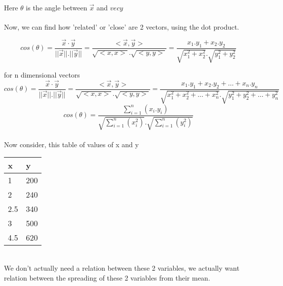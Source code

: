 \documentclass{article}
\begin{document}
\\
Here $\theta$ is the angle between $\vec{x}$ and $vec{y}$\\\\
Now, we can find how 'related' or 'close' are 2 vectors, using the dot product.

$$
  cos(\theta)=\frac{\vec{x}\cdot\vec{y}}{||\vec{x}||.||\vec{y}||}=\frac{<\vec{x},\vec{y}>}{\sqrt{<x,x>}.\sqrt{<y,y>}}=\frac{x_1.y_1+x_2.y_2}{\sqrt{x_1^2+x_2^2}.\sqrt{y_1^2+y_2^2}}
$$

for n dimensional vectors
$$
  cos(\theta)=\frac{\vec{x}\cdot\vec{y}}{||\vec{x}||.||\vec{y}||}=\frac{<\vec{x},\vec{y}>}{\sqrt{<x,x>}.\sqrt{<y,y>}}=\frac{x_1.y_1+x_2.y_2+\dots+x_n.y_n}{\sqrt{x_1^2+x_2^2+\dots+x_n^2}.\sqrt{y_1^2+y_2^2+\dots+y_n^2}}
$$
$$
  cos(\theta)=\frac{\sum_{i=1}^{n}(x_i.y_i)}{\sqrt{\sum_{i=1}^{n}(x_i^2)}.\sqrt{\sum_{i=1}^{n}(y_i^2)}}
$$
\\
Now consider, this table of values of x and y

\begin{tabular}{|l|l|}
  \hline
  \textbf{x} & \textbf{y} \\
  \hline
  1          & 200        \\
  2          & 240        \\
  2.5        & 340        \\
  3          & 500        \\
  4.5        & 620        \\
  \hline
\end{tabular}
\\
We don't actually need a relation between these 2 variables, we actually want relation between the spreading of these 2 variables from their mean.\\
\pagebreak
\end{document}
